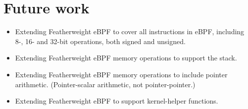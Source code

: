\section{Future work}
\label{sec:future_work}

\begin{itemize}
\item Extending Featherweight eBPF to cover all instructions in eBPF, including 8-, 16- and 32-bit operations, both signed and unsigned. 
\item Extending Featherweight eBPF memory operations to support the stack.
\item Extending Featherweight eBPF memory operations to include pointer arithmetic. (Pointer-scalar arithmetic, not pointer-pointer.)
\item Extending Featherweight eBPF to support kernel-helper functions.
\end{itemize}
